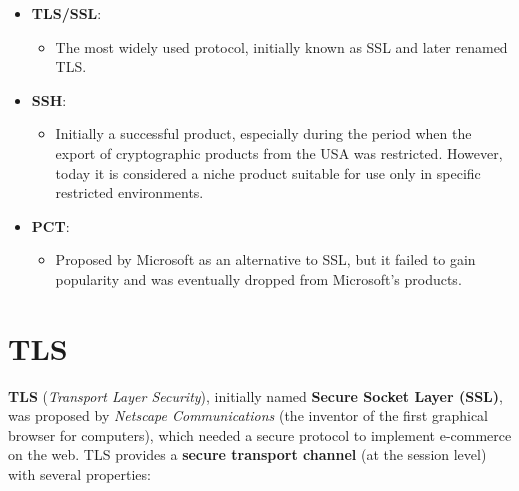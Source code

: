 \begin{itemize}
	\item \textbf{TLS/SSL}:
	      \begin{itemize}
		      \item The most widely used protocol, initially known as SSL and later renamed TLS.
	      \end{itemize}
	\item \textbf{SSH}:
	      \begin{itemize}
		      \item Initially a successful product, especially during the period when the export of cryptographic products from the USA was restricted. However, today it is considered a niche product suitable for use only in specific restricted environments.
	      \end{itemize}
	\item \textbf{PCT}:
	      \begin{itemize}
		      \item Proposed by Microsoft as an alternative to SSL, but it failed to gain popularity and was eventually dropped from Microsoft's products.
	      \end{itemize}
\end{itemize}


\section{TLS}
\textbf{TLS} (\textit{Transport Layer Security}), initially named \textbf{Secure Socket Layer (SSL)}, was proposed by \textit{Netscape Communications} (the inventor of the first graphical browser for computers), which needed a secure protocol to implement e-commerce on the web. TLS provides a \textbf{secure transport channel} (at the session level) with several properties:

